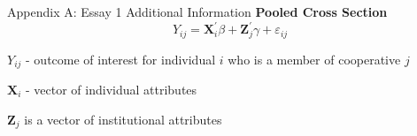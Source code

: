 \documentclass[aspectratio=169]{beamer}
\newenvironment{wideitemize}{\itemize\addtolength{\itemsep}{10pt}}{\enditemize}
\begin{document}
\begin{frame}{Appendix A: Essay 1 Additional Information}
\textbf{Pooled Cross Section} \vspace{1cm}
        \begin{equation} \label{eq:E1_4}
            Y_{ij} = \mathbf{X}_i^{\prime}\beta + \mathbf{Z}_j^{\prime}\gamma + \varepsilon_{ij}
        \end{equation}  
    \begin{wideitemize}    
        \item $Y_{ij}$ - outcome of interest for individual $i$ who is a member of cooperative $j$
        \item $\mathbf{X}_i$ - vector of individual attributes
        \item $\mathbf{Z}_j$ is a vector of institutional attributes
    \end{wideitemize}    
\end{frame}

\begin{frame}
        \begin{table}[H]
        \caption{Decomposition Components (Cross-Section)}
        \label{table:E1_1}
        \centering
        \end{table} 
\end{frame}
\end{document}
